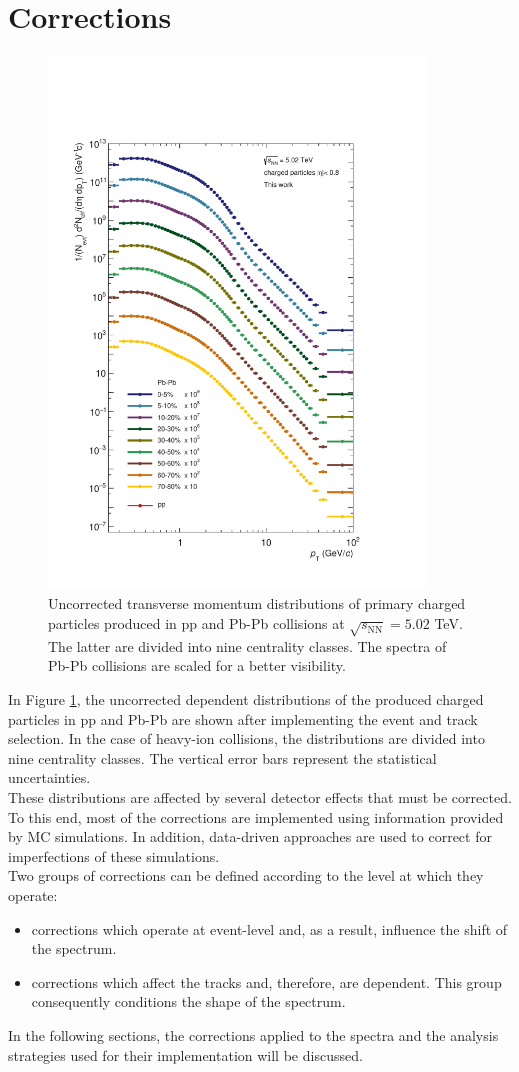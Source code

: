 \documentclass[12pt,a4paper]{report}
\begin{document}
\section{Corrections}
\begin{figure}[tb!]
\centering
\includegraphics[width=10cm]{Plots/uncorrectedSpectra.pdf}  
\caption{Uncorrected transverse momentum distributions of primary charged particles produced in pp and Pb-Pb collisions at $\sqrt{s_\text{NN}} = 5.02$ TeV. The latter are divided into nine centrality classes. The \pt spectra of Pb-Pb collisions are scaled for a better visibility. }
\label{uncorrSpec}
\end{figure}
In Figure \ref{uncorrSpec}, the uncorrected \pt dependent distributions of the produced charged particles in pp and Pb-Pb are shown after implementing the event and track selection. In the case of heavy-ion collisions, the \pt distributions are divided into nine centrality classes. The vertical error bars represent the statistical uncertainties.\\
These \pt distributions are affected by several detector effects that must be corrected. To this end, most of the corrections are implemented using information provided by MC simulations. In addition, data-driven approaches are used to correct for imperfections of these simulations. \\
Two groups of corrections can be defined according to the level at which they operate: 
\begin{itemize}
\item corrections which operate at event-level and, as a result, influence the shift of the spectrum.
\item corrections which affect the tracks and, therefore, are \pt dependent. This group consequently conditions the shape of the spectrum.
\end{itemize}
In the following sections, the corrections applied to the \pt spectra and the analysis strategies used for their implementation will be discussed.
\end{document}
